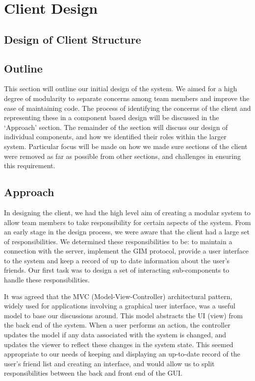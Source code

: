 \section{Client Design}

\subsection{Design of Client Structure}

\subsection{Outline}

This section will outline our initial design of the system. We aimed for a high degree of modularity to separate concerns among team members and improve the ease of maintaining code. The process of identifying the concerns of the client and representing these in a component based design will be discussed in the `Approach' section. The remainder of the section will discuss our design of individual components, and how we identified their roles within the larger system. Particular focus will be made on how we made sure sections of the client were removed as far as possible from other sections, and challenges in ensuring this requirement. 

\subsection{Approach}

In designing the client, we had the high level aim of creating a modular system to allow team members to take responsibility for certain aspects of the system. From an early stage in the design process, we were aware that the client had a large set of responsibilities. We determined these responsibilities to be: to maintain a connection with the server, implement the GIM protocol, provide a user interface to the system and keep a record of up to date information about the user's friends. Our first task was to design a set of interacting sub-components to handle these responsibilities.

It was agreed that the MVC (Model-View-Controller) architectural pattern, widely used for applications involving a graphical user interface, was a useful model to base our discussions around. This model abstracts the UI (view) from the back end of the system. When a user performs an action, the controller updates the model if any data associated with the system is changed, and updates the viewer to reflect these changes in the system state. This seemed appropriate to our needs of keeping and displaying an up-to-date record of the user's friend list and creating an interface, and would allow us to split responsibilities between the back and front end of the GUI.

